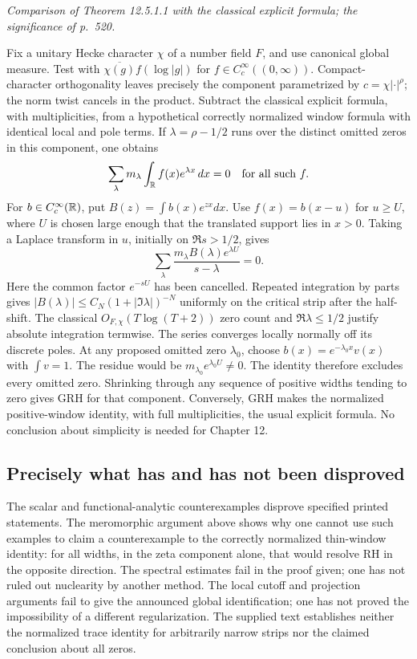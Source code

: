 \documentclass[11pt,reqno]{amsart}
\numberwithin{equation}{section}
\begin{document}
\textit{Comparison of Theorem 12.5.1.1 with the classical explicit formula; the significance of p.~520.}\par
Fix a unitary Hecke character \(\chi\) of a number field \(F\), and use canonical global measure. Test with \(\overline{\chi(g)}f(\log|g|)\) for \(f\in C_c^\infty((0,\infty))\). Compact-character orthogonality leaves precisely the component parametrized by \(c=\chi|\cdot|^\rho\); the norm twist cancels in the product. Subtract the classical explicit formula, with multiplicities, from a hypothetical correctly normalized window formula with identical local and pole terms. If \(\lambda=\rho-1/2\) runs over the distinct omitted zeros in this component, one obtains
\[
       \sum_{\lambda}m_\lambda\int_\mathbb R f(x)e^{\lambda x}\,dx=0
       \quad\text{for all such } f.
\]
For \(b\in C_c^\infty(\mathbb R)\), put \(B(z)=\int b(x)e^{zx}dx\). Use \(f(x)=b(x-u)\) for \(u\ge U\), where \(U\) is chosen large enough that the translated support lies in \(x>0\). Taking a Laplace transform in \(u\), initially on \(\Re s>1/2\), gives
\[
       \sum_\lambda\frac{m_\lambda B(\lambda)e^{\lambda U}}{s-\lambda}=0 .
\]
Here the common factor \(e^{-sU}\) has been cancelled. Repeated integration by parts gives \(|B(\lambda)|\le C_N(1+|\Im\lambda|)^{-N}\) uniformly on the critical strip after the half-shift. The classical \(O_{F,\chi}(T\log(T+2))\) zero count and \(\Re\lambda\le1/2\) justify absolute integration termwise. The series converges locally normally off its discrete poles. At any proposed omitted zero \(\lambda_0\), choose \(b(x)=e^{-\lambda_0x}v(x)\) with \(\int v=1\). The residue would be \(m_{\lambda_0}e^{\lambda_0U}\ne0\). The identity therefore excludes every omitted zero. Shrinking through any sequence of positive widths tending to zero gives GRH for that component. Conversely, GRH makes the normalized positive-window identity, with full multiplicities, the usual explicit formula. No conclusion about simplicity is needed for Chapter 12.

\subsection*{Precisely what has and has not been disproved}
The scalar and functional-analytic counterexamples disprove specified printed statements. The meromorphic argument above shows why one cannot use such examples to claim a counterexample to the correctly normalized thin-window identity: for all widths, in the zeta component alone, that would resolve RH in the opposite direction. The spectral estimates fail in the proof given; one has not ruled out nuclearity by another method. The local cutoff and projection arguments fail to give the announced global identification; one has not proved the impossibility of a different regularization. The supplied text establishes neither the normalized trace identity for arbitrarily narrow strips nor the claimed conclusion about all zeros.
\end{document}
